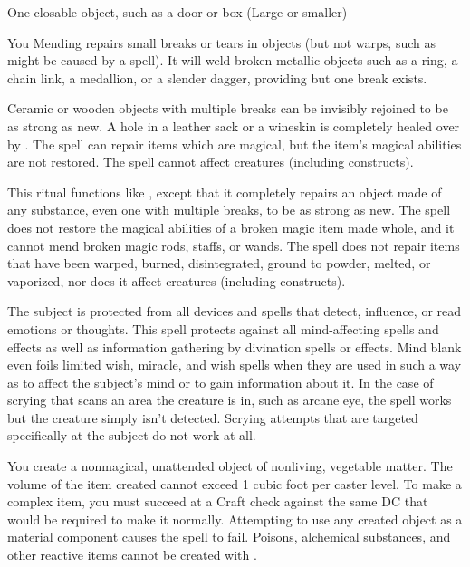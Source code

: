 \begin{spelltarget}{One closable object, such as a door or box (Large or smaller)}
\begin{spelltarget}{You}
\spelleffect Mending repairs small breaks or tears in objects (but not warps, such as might be caused by a  spell). It will weld broken metallic objects such as a ring, a chain link, a medallion, or a slender dagger, providing but one break exists.
\par Ceramic or wooden objects with multiple breaks can be invisibly rejoined to be as strong as new. A hole in a leather sack or a wineskin is completely healed over by . The spell can repair items which are magical, but the item's magical abilities are not restored. 
\spellnotes The spell cannot affect creatures (including constructs).

\spelleffect This ritual functions like , except that it completely repairs an object made of any substance, even one with multiple breaks, to be as strong as new. The spell does not restore the magical abilities of a broken magic item made whole, and it cannot mend broken magic rods, staffs, or wands. The spell does not repair items that have been warped, burned, disintegrated, ground to powder, melted, or vaporized, nor does it affect creatures (including constructs).

\spelldur{\durext}
\spelleffect The subject is protected from all devices and spells that detect, influence, or read emotions or thoughts. This spell protects against all mind-affecting spells and effects as well as information gathering by divination spells or effects. Mind blank even foils limited wish, miracle, and wish spells when they are used in such a way as to affect the subject's mind or to gain information about it. In the case of scrying that scans an area the creature is in, such as arcane eye, the spell works but the creature simply isn't detected. Scrying attempts that are targeted specifically at the subject do not work at all.

\spelldur{\durext \dismissable}
\spelleffect You create a nonmagical, unattended object of nonliving, vegetable matter. The volume of the item created cannot exceed 1 cubic foot per caster level. To make a complex item, you must succeed at a Craft check against the same DC that would be required to make it normally.
\spellnotes Attempting to use any created object as a material component causes the spell to fail. Poisons, alchemical substances, and other reactive items cannot be created with .


\end{spelltarget}
\end{spelltarget}
